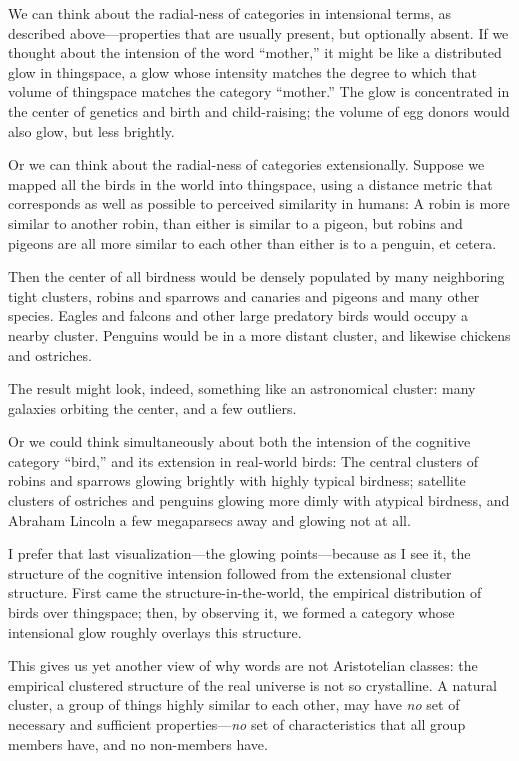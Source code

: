 {
 We can think about the radial-ness of categories in intensional
terms, as described above---properties that are usually present, but
optionally absent. If we thought about the intension of the word
``mother,'' it might be like a
distributed glow in thingspace, a glow whose intensity matches the
degree to which that volume of thingspace matches the category
``mother.'' The glow is concentrated
in the center of genetics and birth and child-raising; the volume of
egg donors would also glow, but less brightly.}

{
 Or we can think about the radial-ness of categories extensionally.
Suppose we mapped all the birds in the world into thingspace, using a
distance metric that corresponds as well as possible to perceived
similarity in humans: A robin is more similar to another robin, than
either is similar to a pigeon, but robins and pigeons are all more
similar to each other than either is to a penguin, et cetera.}

{
 Then the center of all birdness would be densely populated by many
neighboring tight clusters, robins and sparrows and canaries and
pigeons and many other species. Eagles and falcons and other large
predatory birds would occupy a nearby cluster. Penguins would be in a
more distant cluster, and likewise chickens and ostriches.}

{
 The result might look, indeed, something like an astronomical
cluster: many galaxies orbiting the center, and a few outliers.}

{
 Or we could think simultaneously about both the intension of the
cognitive category ``bird,'' and its
extension in real-world birds: The central clusters of robins and
sparrows glowing brightly with highly typical birdness; satellite
clusters of ostriches and penguins glowing more dimly with atypical
birdness, and Abraham Lincoln a few megaparsecs away and glowing not at
all.}

{
 I prefer that last visualization---the glowing points---because as
I see it, the structure of the cognitive intension followed from the
extensional cluster structure. First came the structure-in-the-world,
the empirical distribution of birds over thingspace; then, by observing
it, we formed a category whose intensional glow roughly overlays this
structure.}

{
 This gives us yet another view of why words are not Aristotelian
classes: the empirical clustered structure of the real universe is not
so crystalline. A natural cluster, a group of things highly similar to
each other, may have \textit{no} set of necessary and sufficient
properties---\textit{no} set of characteristics that all group members
have, and no non-members have.}

